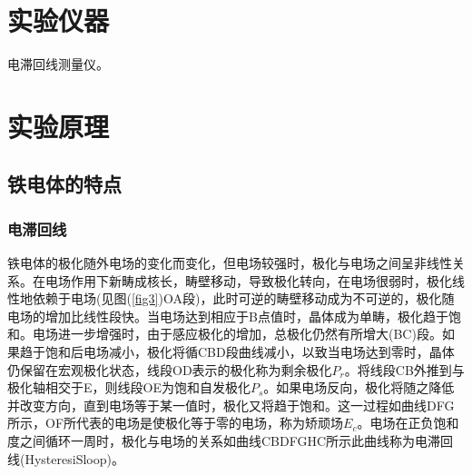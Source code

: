 \documentclass[a4paper]{article}
\begin{document}
\section{实验仪器}
电滞回线测量仪。

\section{实验原理}
\subsection{铁电体的特点}
\subsubsection{电滞回线}
铁电体的极化随外电场的变化而变化，但电场较强时，极化与电场之间呈非线性关系。在电场作用下新畴成核长，畴壁移动，导致极化转向，在电场很弱时，极化线性地依赖于电场(见图(\ref{fig3})OA段)，此时可逆的畴壁移动成为不可逆的，极化随电场的增加比线性段快。当电场达到相应于B点值时，晶体成为单畴，极化趋于饱和。电场进一步增强时，由于感应极化的增加，总极化仍然有所增大(BC)段。如果趋于饱和后电场减小，极化将循CBD段曲线减小，以致当电场达到零时，晶体仍保留在宏观极化状态，线段OD表示的极化称为剩余极化$P_r$。将线段CB外推到与极化轴相交于E，则线段OE为饱和自发极化$P_s$。如果电场反向，极化将随之降低并改变方向，直到电场等于某一值时，极化又将趋于饱和。这一过程如曲线DFG所示，OF所代表的电场是使极化等于零的电场，称为矫顽场$E_c$。电场在正负饱和度之间循环一周时，极化与电场的关系如曲线CBDFGHC所示此曲线称为电滞回线(HysteresiSloop)。
\end{document}
